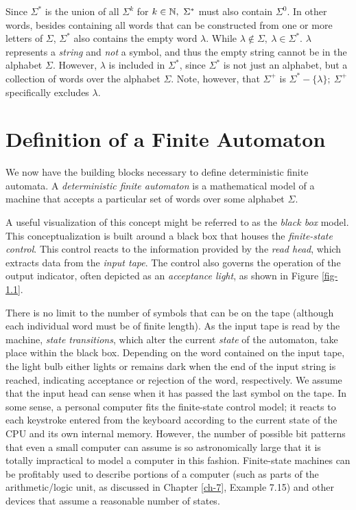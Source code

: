 Since $\Sigma^*$ is the union of all $\Sigma^k$ for $k \in \mathbb{N},\ \Sigma^*$ must
also contain $\Sigma^0$. In other words, besides containing all words that can
be constructed from one or more letters of $\Sigma$, $\Sigma^*$ also contains
the empty word $\lambda$. While $\lambda \not \in \Sigma,\ \lambda \in \Sigma^*$.
$\lambda$ represents a \emph{string} and \emph{not} a symbol, and thus the empty
string cannot be in the alphabet $\Sigma$. However, $\lambda$ is included in
$\Sigma^*$, since $\Sigma^*$ is not just an alphabet, but a collection of words
over the alphabet $\Sigma$. Note, however, that $\Sigma^+$ is
$\Sigma^* - \{\lambda\};\ \Sigma^+$ specifically excludes $\lambda$.

\section{Definition of a Finite Automaton}\label{sec-1.2}

We now have the building blocks necessary to define deterministic finite
automata. A \emph{deterministic finite automaton} is a mathematical model of a
machine that accepts a particular set of words over some alphabet $\Sigma$.

A useful visualization of this concept might be referred to as the
\emph{black box} model. This conceptualization is built around a black box that
houses the \emph{finite-state control}. This control reacts to the information
provided by the \emph{read head}, which extracts data from the \emph{input tape}.
The control also governs the operation of the output indicator, often depicted
as an \emph{acceptance light}, as shown in Figure \ref{fig-1.1}.

There is no limit to the number of symbols that can be on the tape (although
each individual word must be of finite length). As the input tape is read by the
machine, \emph{state transitions}, which alter the current \emph{state} of the
automaton, take place within the black box. Depending on the word contained on
the input tape, the light bulb either lights or remains dark when the end of the
input string is reached, indicating acceptance or rejection of the word,
respectively. We assume that the input head can sense when it has passed the
last symbol on the tape. In some sense, a personal computer fits the
finite-state control model; it reacts to each keystroke entered from the
keyboard according to the current state of the CPU and its own internal memory.
However, the number of possible bit patterns that even a small computer can
assume is so astronomically large that it is totally impractical to model a
computer in this fashion. Finite-state machines can be profitably used to
describe portions of a computer (such as parts of the arithmetic/logic unit, as
discussed in Chapter \ref{ch-7}, Example 7.15) and other devices that
assume a reasonable number of states.

